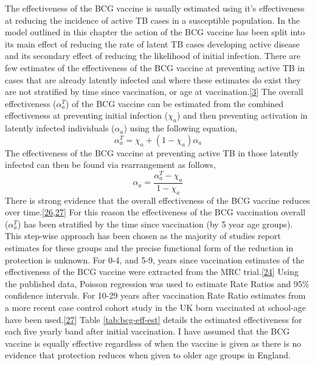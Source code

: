 \documentclass[11pt,twoside]{bristolthesis}
\begin{document}
  The effectiveness of the BCG vaccine is usually estimated using it's effectiveness at reducing the incidence of active TB cases in a susceptible population. In the model outlined in this chapter the action of the BCG vaccine has been split into its main effect of reducing the rate of latent TB cases developing active disease and its secondary effect of reducing the likelihood of initial infection. There are few estimates of the effectiveness of the BCG vaccine at preventing active TB in cases that are already latently infected and where these estimates do exist they are not stratified by time since vaccination, or age at vaccination.{[}\protect\hyperlink{ref-Roy2014}{3}{]} The overall effectiveness (\(\alpha^T_a\)) of the BCG vaccine can be estimated from the combined effectiveness at preventing initial infection (\(\chi_a\)) and then preventing activation in latently infected individuals (\(\alpha_a\)) using the following equation,
  \begin{equation}
    \alpha^T_a = \chi_a + (1 - \chi_a) \alpha_a
    \label{eq:full-bcg-effectiveness}
  \end{equation}
  The effectiveness of the BCG vaccine at preventing active TB in those latently infected can then be found via rearrangement as follows,
  \begin{equation}
    \alpha_a = \frac{\alpha^T_a - \chi_a}{1 - \chi_a}
    \label{eq:latent-active-bcg-effectiveness}
  \end{equation}
  There is strong evidence that the overall effectiveness of the BCG vaccine reduces over time.{[}\protect\hyperlink{ref-Abubakar2013}{26},\protect\hyperlink{ref-Mangtani2017}{27}{]} For this reason the effectiveness of the BCG vaccination overall (\(\alpha^T_a\)) has been stratified by the time since vaccination (by 5 year age groups). This step-wise approach has been chosen as the majority of studies report estimates for these groups and the precise functional form of the reduction in protection is unknown. For 0-4, and 5-9, years since vaccination estimates of the effectiveness of the BCG vaccine were extracted from the MRC trial.{[}\protect\hyperlink{ref-Hart1972}{24}{]} Using the published data, Poisson regression was used to estimate Rate Ratios and 95\% confidence intervals. For 10-29 years after vaccination Rate Ratio estimates from a more recent case control cohort study in the UK born vaccinated at school-age have been used.{[}\protect\hyperlink{ref-Mangtani2017}{27}{]} Table \ref{tab:bcg-eff-est} details the estimated effectiveness for each five yearly band after initial vaccination. I have assumed that the BCG vaccine is equally effective regardless of when the vaccine is given as there is no evidence that protection reduces when given to older age groups in England.
\end{document}
